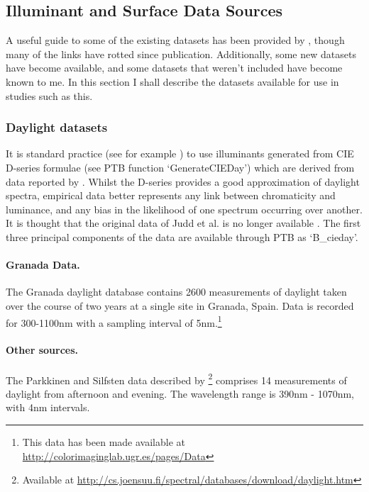 \subsection{Illuminant and Surface Data Sources} \label{sec:coldata}

A useful guide to some of the existing datasets has been provided by \citet{kohonen_databases_2006}, though many of the links have rotted since publication. Additionally, some new datasets have become available, and some datasets that weren't included have become known to me. In this section I shall describe the datasets available for use in studies such as this.

\subsubsection{Daylight datasets}

It is standard practice (see for example \citet{barrionuevo_contributions_2014}) to use illuminants generated from CIE D-series formulae (see \gls{PTB} function `GenerateCIEDay') which are derived from data reported by \citet{judd_spectral_1964}. Whilst the D-series provides a good approximation of daylight spectra, empirical data better represents any link between chromaticity and luminance, and any bias in the likelihood of one spectrum occurring over another. It is thought that the original data of Judd et al. is no longer available \citep[p.~60]{maloney_computational_1984}. The first three principal components of the data are available through \gls{PTB} as `B\_cieday'.

\paragraph{Granada Data.}
The Granada daylight database \citep{hernandez-andres_color_2001} contains 2600 measurements of daylight taken over the course of two years at a single site in Granada, Spain. Data is recorded for 300-1100nm with a sampling interval of 5nm.\footnote{This data has been made available at \url{http://colorimaginglab.ugr.es/pages/Data}}

\paragraph{Other sources.}

The Parkkinen and Silfsten data described by \citet{kohonen_databases_2006}\footnote{Available at \url{http://cs.joensuu.fi/spectral/databases/download/daylight.htm}} comprises 14 measurements of daylight from afternoon and evening. The wavelength range is 390nm - 1070nm, with 4nm intervals.

